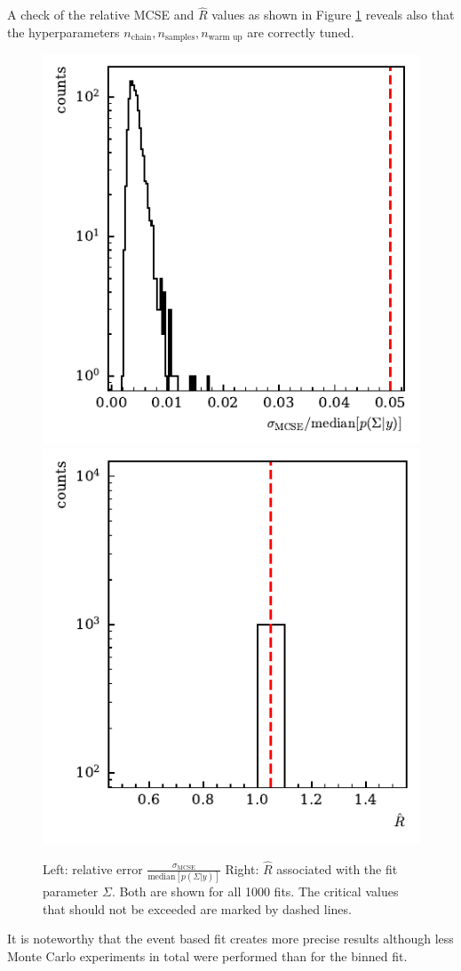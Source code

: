  A check of the relative MCSE and $\widehat{R}$ values as shown in Figure \ref{fig:toyMC_diagnostics1} reveals also that the hyperparameters $n_\text{chain},n_\text{samples},n_\text{warm up}$ are correctly tuned.
 \begin{figure}[htbp]
 	\includegraphics[width=.49\linewidth]{../bayes/event_based_fit/plots/toyMC_mcse_hist.pdf}
 	\includegraphics[width=.49\linewidth]{../bayes/event_based_fit/plots/toyMC_rhat_hist.pdf}
 	\caption{ Left: relative error $\frac{\sigma_\text{MCSE}}{\text{median}\left[p\left(\Sigma|y\right)\right]}$ Right: $\widehat{R}$ associated with the fit parameter $\Sigma$. Both are shown for all 1000 fits. The critical values that should not be exceeded are marked by dashed lines.}
 	\label{fig:toyMC_diagnostics1}
 \end{figure}
It is noteworthy that the event based fit creates more precise results although less Monte Carlo experiments in total were performed than for the binned fit. 

